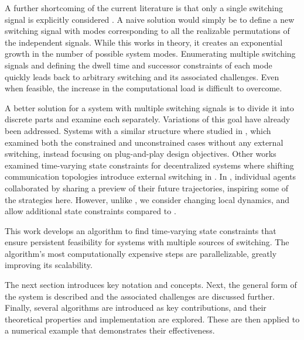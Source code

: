 A further shortcoming of the current literature is that only a single switching signal is explicitly considered \cite{Danielson2019,Athanasopoulos2017,Zhang2016, Santis2004}. A naive solution would simply be to define a new switching signal with modes corresponding to all the realizable permutations of the independent signals. While this works in theory, it creates an exponential growth in the number of possible system modes. Enumerating multiple switching signals and defining the dwell time and successor constraints of each mode quickly leads back to arbitrary switching and its associated challenges. Even when feasible, the increase in the computational load is difficult to overcome. 

A better solution for a system with multiple switching signals is to divide it into discrete parts and examine each separately. Variations of this goal have already been addressed. Systems with a similar structure where studied in \cite{Riverso2015}, which examined both the constrained and unconstrained cases without any external switching, instead focusing on plug-and-play design objectives. Other works examined time-varying state constraints for decentralized systems where shifting communication topologies introduce external switching in \cite{Ahandani2020, Li2020}. In \cite{Li2020}, individual agents collaborated by sharing a preview of their future trajectories, inspiring some of the strategies here. However, unlike \cite{Ahandani2020, Li2020}, we consider changing local dynamics, and allow additional state constraints compared to \cite{Li2020}.

This work develops an algorithm to find time-varying state constraints that ensure persistent feasibility for systems with multiple sources of switching. The algorithm's most computationally expensive steps are parallelizable, greatly improving its scalability. 

The next section introduces key notation and concepts. Next, the general form of the system is described and the associated challenges are discussed further. Finally, several algorithms are introduced as key contributions, and their theoretical properties and implementation are explored. These are then applied to a numerical example that demonstrates their effectiveness. 
